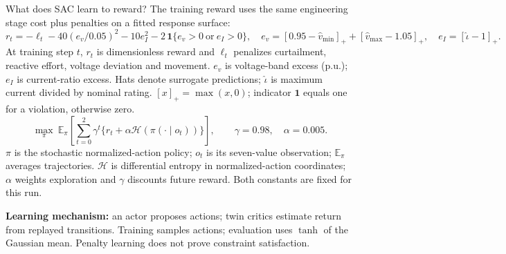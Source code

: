 \begin{frame}[t]{What does SAC learn to reward?}
\deepdive
\footnotesize
The training reward uses the same engineering stage cost plus penalties on a fitted response surface:
\[
r_t=-\ell_t-40(e_v/0.05)^2-10e_I^2-2\,\mathbf1\{e_v>0\ \text{or}\ e_I>0\},
\quad e_v=[0.95-\widehat v_{\min}]_++[\widehat v_{\max}-1.05]_+,\quad e_I=[\widehat\iota-1]_+.
\]
At training step $t$, $r_t$ is dimensionless reward and $\ell_t$ penalizes curtailment, reactive effort, voltage deviation and movement. $e_v$ is voltage-band excess (p.u.); $e_I$ is current-ratio excess. Hats denote surrogate predictions; $\widehat\iota$ is maximum current divided by nominal rating. $[x]_+=\max(x,0)$; indicator $\mathbf1$ equals one for a violation, otherwise zero.
\[
\max_\pi\ \mathbb E_\pi\!\left[\sum_{t=0}^{2}\gamma^t\{r_t+\alpha\mathcal H(\pi(\cdot\mid o_t))\}\right],
\qquad \gamma=0.98,\quad\alpha=0.005.
\]
$\pi$ is the stochastic normalized-action policy; $o_t$ is its seven-value observation; $\mathbb E_\pi$ averages trajectories. $\mathcal H$ is differential entropy in normalized-action coordinates; $\alpha$ weights exploration and $\gamma$ discounts future reward. Both constants are fixed for this run.
\smallskip\par\small
\textbf{Learning mechanism:} an actor proposes actions; twin critics estimate return from replayed transitions. Training samples actions; evaluation uses $\tanh$ of the Gaussian mean. Penalty learning does not prove constraint satisfaction.
\end{frame}

